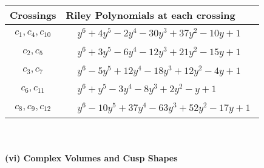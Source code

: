 \documentclass[1p]{elsarticle_modified}
\theoremstyle{definition}
\begin{document}
\begin{tabular}{m{50pt}|m{274pt}}
Crossings & \hspace{64pt}Riley Polynomials at each crossing \\
\hline $$\begin{aligned}c_{1},c_{4},c_{10}\end{aligned}$$&$\begin{aligned}
&y^6+4 y^5-2 y^4-30 y^3+37 y^2-10 y+1
\end{aligned}$\\
\hline $$\begin{aligned}c_{2},c_{5}\end{aligned}$$&$\begin{aligned}
&y^6+3 y^5-6 y^4-12 y^3+21 y^2-15 y+1
\end{aligned}$\\
\hline $$\begin{aligned}c_{3},c_{7}\end{aligned}$$&$\begin{aligned}
&y^6-5 y^5+12 y^4-18 y^3+12 y^2-4 y+1
\end{aligned}$\\
\hline $$\begin{aligned}c_{6},c_{11}\end{aligned}$$&$\begin{aligned}
&y^6+y^5-3 y^4-8 y^3+2 y^2- y+1
\end{aligned}$\\
\hline $$\begin{aligned}c_{8},c_{9},c_{12}\end{aligned}$$&$\begin{aligned}
&y^6-10 y^5+37 y^4-63 y^3+52 y^2-17 y+1
\end{aligned}$\\
\hline
\end{tabular}\\~\\
\newpage\flushleft \textbf{(vi) Complex Volumes and Cusp Shapes}
\end{document}
